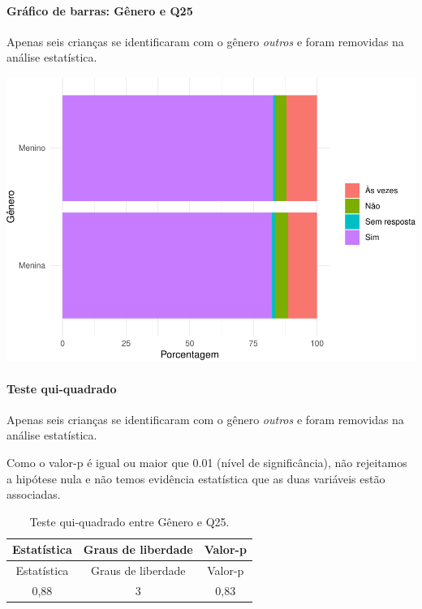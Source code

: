 \documentclass[]{article}
\let\oldparagraph\paragraph
\renewcommand{\paragraph}[1]{\oldparagraph{#1}\mbox{}}
\begin{document}
\hypertarget{gruxe1fico-de-barras-guxeanero-e-q25}{%
\paragraph{Gráfico de barras: Gênero e Q25}\label{gruxe1fico-de-barras-guxeanero-e-q25}}

Apenas seis crianças se identificaram com o gênero \emph{outros} e foram removidas na análise estatística.

\begin{center}\includegraphics[width=0.75\linewidth]{relatorio_covid19_files/figure-latex/unnamed-chunk-673-1} \end{center}

\hypertarget{teste-qui-quadrado-58}{%
\paragraph{Teste qui-quadrado}\label{teste-qui-quadrado-58}}

Apenas seis crianças se identificaram com o gênero \emph{outros} e foram removidas na análise estatística.

Como o valor-p é igual ou maior que 0.01 (nível de significância), não rejeitamos a hipótese nula e não temos evidência estatística que as duas variáveis estão associadas.

\begin{longtable}[]{@{}ccc@{}}
\caption{\label{tab:unnamed-chunk-675}Teste qui-quadrado entre Gênero e Q25.}\tabularnewline
\toprule
Estatística & Graus de liberdade & Valor-p\tabularnewline
\midrule
\endfirsthead
\toprule
Estatística & Graus de liberdade & Valor-p\tabularnewline
\midrule
\endhead
0,88 & 3 & 0,83\tabularnewline
\bottomrule
\end{longtable}

\cleardoublepage
\end{document}
